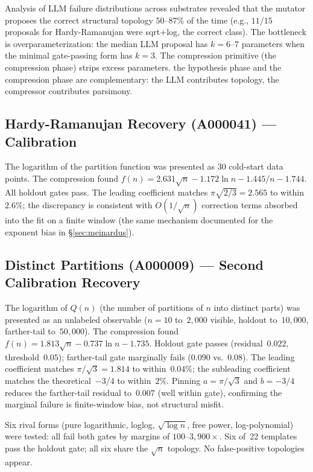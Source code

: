 \documentclass[12pt]{article}
\begin{document}
Analysis of LLM failure distributions across substrates revealed that the mutator proposes the correct structural topology $50$--$87\%$ of the time (e.g., $11/15$ proposals for Hardy-Ramanujan were sqrt+log, the correct class). The bottleneck is overparameterization: the median LLM proposal has $k = 6$--$7$ parameters when the minimal gate-passing form has $k = 3$. The compression primitive (the compression phase) strips excess parameters. the hypothesis phase and the compression phase are complementary: the LLM contributes topology, the compressor contributes parsimony.

\subsection{Hardy-Ramanujan Recovery (A000041) --- Calibration}

The logarithm of the partition function was presented as 30 cold-start data points. The compression found $f(n) = 2.631\sqrt{n} - 1.172 \ln n - 1.445/n - 1.744$. All holdout gates pass. The leading coefficient matches $\pi\sqrt{2/3} = 2.565$ to within~$2.6\%$; the discrepancy is consistent with $O(1/\sqrt{n})$ correction terms absorbed into the fit on a finite window (the same mechanism documented for the exponent bias in \S\ref{sec:meinardus}).

\subsection{Distinct Partitions (A000009) --- Second Calibration Recovery}

The logarithm of $Q(n)$ (the number of partitions of $n$ into distinct parts) was presented as an unlabeled observable ($n = 10$ to~$2{,}000$ visible, holdout to~$10{,}000$, farther-tail to~$50{,}000$). The compression found $f(n) = 1.813\sqrt{n} - 0.737 \ln n - 1.735$. Holdout gate passes (residual~$0.022$, threshold~$0.05$); farther-tail gate marginally fails ($0.090$ vs.~$0.08$). The leading coefficient matches $\pi/\sqrt{3} = 1.814$ to within~$0.04\%$; the subleading coefficient matches the theoretical~$-3/4$ to within~$2\%$. Pinning $a = \pi/\sqrt{3}$ and $b = -3/4$ reduces the farther-tail residual to~$0.007$ (well within gate), confirming the marginal failure is finite-window bias, not structural misfit.

Six rival forms (pure logarithmic, loglog, $\sqrt{\log n}$, free power, log-polynomial) were tested: all fail both gates by margins of $100$--$3{,}900\times$. Six of~22 templates pass the holdout gate; all six share the $\sqrt{n}$ topology. No false-positive topologies appear.
\end{document}

